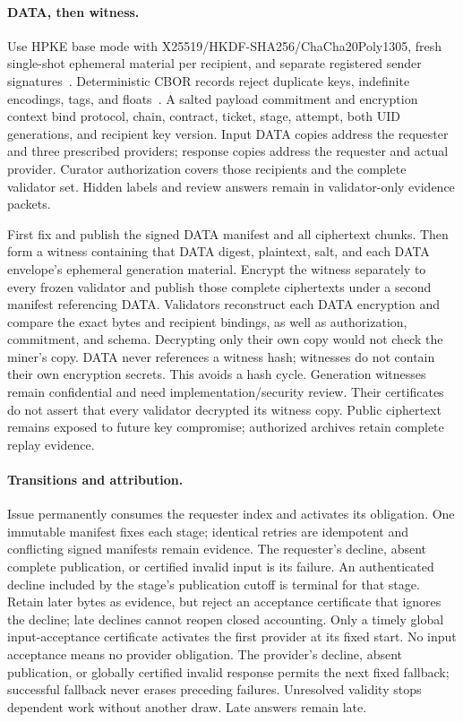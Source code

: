 \paragraph{DATA, then witness.}
Use HPKE base mode with X25519/HKDF-SHA256/ChaCha20Poly1305, fresh
single-shot ephemeral material per recipient, and separate registered
sender signatures~\cite{hpke}. Deterministic CBOR records reject duplicate
keys, indefinite encodings, tags, and floats~\cite{cbor}. A salted payload
commitment and encryption context bind protocol, chain, contract, ticket,
stage, attempt, both UID generations, and recipient key version. Input
DATA copies address the requester and three prescribed providers; response
copies address the requester and actual provider. Curator authorization
covers those recipients and the complete validator set. Hidden labels and
review answers remain in validator-only evidence packets.

First fix and publish the signed DATA manifest and all ciphertext chunks.
Then form a witness containing that DATA digest, plaintext, salt, and each
DATA envelope's ephemeral generation material. Encrypt the witness
separately to every frozen validator and publish those complete ciphertexts
under a second manifest referencing DATA. Validators reconstruct each DATA
encryption and compare the exact bytes and recipient bindings, as well as
authorization, commitment, and schema. Decrypting only their own copy would
not check the miner's copy. DATA never references a witness hash; witnesses
do not contain their own encryption secrets. This avoids a hash cycle.
Generation witnesses remain confidential and need implementation/security
review. Their certificates do not assert that every validator decrypted
its witness copy. Public ciphertext remains exposed to future key
compromise; authorized archives retain complete replay evidence.

\paragraph{Transitions and attribution.}
Issue permanently consumes the requester index and activates its
obligation. One immutable manifest fixes each stage; identical retries
are idempotent and conflicting signed manifests remain evidence. The
requester's decline, absent complete publication, or certified invalid
input is its failure. An authenticated decline included by the stage's
publication cutoff is terminal for that stage. Retain later bytes as
evidence, but reject an acceptance certificate that ignores the decline;
late declines cannot reopen closed accounting. Only a timely global input-acceptance certificate
activates the first provider at its fixed start. No input acceptance
means no provider obligation. The provider's decline, absent publication,
or globally certified invalid response permits the next fixed fallback;
successful fallback never erases preceding failures. Unresolved validity
stops dependent work without another draw. Late answers remain late.

